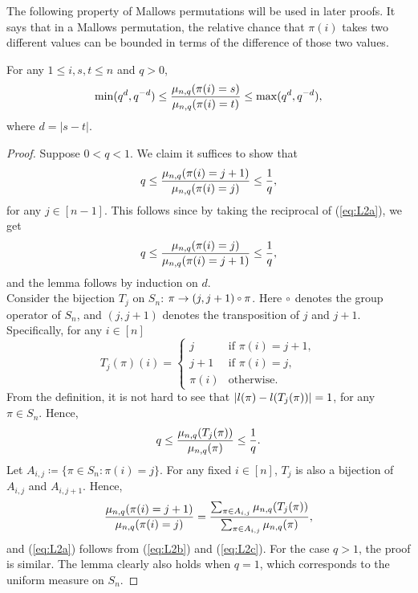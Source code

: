 The following property of Mallows permutations will be used in later proofs. It says that in a Mallows permutation, the relative chance that $\pi(i)$ takes two different values can be bounded in terms of the difference of those two values.

\begin{lemma}\label{L2}
For any $ 1\le i, s, t \le n$ and $q > 0$,
\[
\min( q^d, q^{-d}) \le \frac{\mu_{n, q}(\pi(i)=s)}{\mu_{n, q}(\pi(i)=t)}\le \max( q^d, q^{-d}),
\]
where $d = |s-t|$.
\end{lemma}

\begin{proof}
Suppose $0< q < 1$. We claim it suffices to show that
\begin{equation}
q \le \frac{\mu_{n, q}(\pi(i)=j+1)}{\mu_{n, q}(\pi(i)=j)} \le \frac{1}{q}, \label{eq:L2a}
\end{equation}
for any $j \in [n-1]$. This follows since by taking the reciprocal of (\ref{eq:L2a}), we get
\[
q \le \frac{\mu_{n, q}(\pi(i)=j)}{\mu_{n, q}(\pi(i)=j+1)} \le \frac{1}{q},
\]
and the lemma follows by induction on $d$.\\
Consider the bijection $T_j$ on $S_n$: $\pi \rightarrow (j, j+1) \ccirc \pi$. Here $\ccirc$ denotes the group operator of $S_n$, and $(j, j+1)$ denotes the transposition of $j$ and $j+1$. Specifically, for any $i \in [n]$
\[
T_j(\pi)(i) =
 \begin{cases}
   j &\text{if } \pi(i) = j+1, \\
   j+1 &\text{if } \pi(i) = j, \\
   \pi(i) &\text{otherwise}.
 \end{cases}
\]
From the definition, it is not hard to see that $|l(\pi) - l(T_j(\pi))|=1 $, for any $\pi \in S_n$. Hence,
\begin{equation}
q \le \frac{\mu_{n, q}(T_j(\pi))}{\mu_{n, q}(\pi)} \le \frac{1}{q}. \label{eq:L2b}
\end{equation}
Let $A_{i, j} \coloneqq \{\pi \in S_n: \pi(i) = j\}$. For any fixed $i \in [n]$,  $T_j$ is also a bijection of $A_{i, j}$ and $A_{i, j+1}$. Hence,
\begin{equation}
\frac{\mu_{n, q}(\pi(i)=j+1)}{\mu_{n, q}(\pi(i)=j)} = \frac{\sum_{\pi \in A_{i, j}}\mu_{n, q}(T_j(\pi))}{\sum_{\pi \in A_{i, j}}\mu_{n, q}(\pi)}, \label{eq:L2c}
\end{equation}
and (\ref{eq:L2a}) follows from (\ref{eq:L2b}) and (\ref{eq:L2c}). For the case $q>1$, the proof is similar. The lemma clearly also holds when $q=1$, which corresponds to the uniform measure on $S_n$.

\end{proof}


